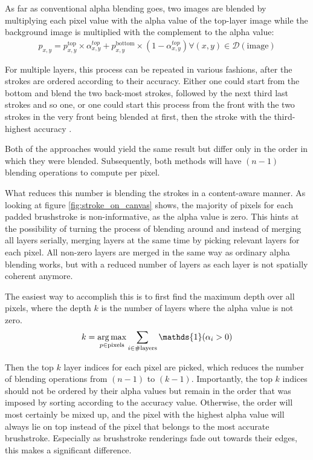 As far as conventional alpha blending goes, two images are blended by multiplying each pixel value with the alpha value of the top-layer image while the background image is multiplied with the complement to the alpha value:
\begin{align}
    p_{x,y} = p^{\text{top}}_{x, y} \times \alpha^{top}_{x, y}
    + p^{\text{bottom}}_{x, y} \times (1 - \alpha^{top}_{x, y})
    \forall (x, y) \in \mathcal{D}(\text{image})
\end{align}

For multiple layers, this process can be repeated in various fashions, after the strokes are ordered according to their accuracy.
Either one could start from the bottom and blend the two back-most strokes, followed by the next third last strokes and so one, or one could start this process from the front with the two strokes in the very front being blended at first, then the stroke with the third-highest accuracy \etc.

Both of the approaches would yield the same result but differ only in the order in which they were blended.
Subsequently, both methods will have $(n-1)$ blending operations to compute per pixel.

What reduces this number is blending the strokes in a content-aware manner.
As looking at figure \ref{fig:stroke_on_canvas} shows, the majority of pixels for each padded brushstroke is non-informative, as the alpha value is zero.
This hints at the possibility of turning the process of blending around and instead of merging all layers serially, merging layers at the same time by picking relevant layers for each pixel.
All non-zero layers are merged in the same way as ordinary alpha blending works, but with a reduced number of layers as each layer is not spatially coherent anymore.


The easiest way to accomplish this is to first find the maximum depth over all pixels, where the depth $k$ is the number of layers where the alpha value is not zero.
\begin{align}
    k = \argmax_{p \in \text{pixels}} \sum_{i \in \# \text{layers}} \mathds{1}(\alpha_i > 0)
\end{align}

Then the top $k$ layer indices for each pixel are picked, which reduces the number of blending operations from $(n-1)$ to $(k-1)$.
Importantly, the top $k$ indices should not be ordered by their alpha values but remain in the order that was imposed by sorting according to the accuracy value.
Otherwise, the order will most certainly be mixed up, and the pixel with the highest alpha value will always lie on top instead of the pixel that belongs to the most accurate brushstroke.
Especially as brushstroke renderings fade out towards their edges, this makes a significant difference.


